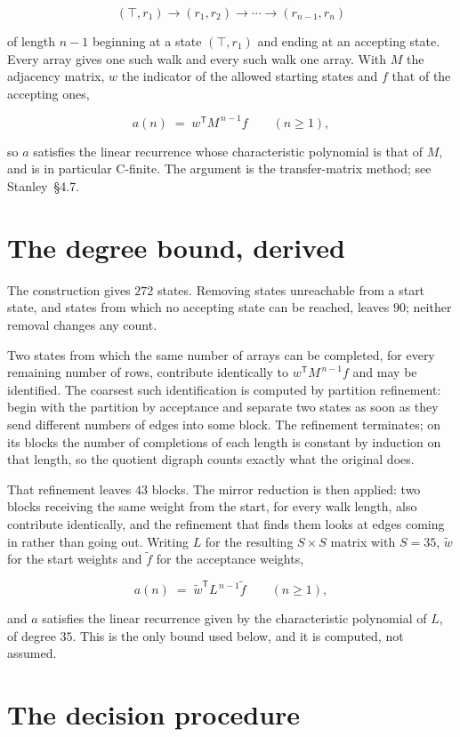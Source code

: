 \documentclass[11pt]{article}
\theoremstyle{definition}
\begin{document}
\[(\top,r_1) \to (r_1,r_2) \to \cdots \to (r_{n-1},r_n)\]

of length $n-1$ beginning at a state $(\top,r_1)$ and ending at an accepting state. Every array gives one such walk and every such walk one array. With $M$ the adjacency matrix, $w$ the indicator of the allowed starting states and $f$ that of the accepting ones,

\[a(n) \;=\; w^{\mathsf T} M^{\,n-1} f \qquad (n \ge 1),\]

so $a$ satisfies the linear recurrence whose characteristic polynomial is that of $M$, and is in particular C-finite. The argument is the transfer-matrix method; see Stanley~\S4.7.

\section{The degree bound, derived}

The construction gives $272$ states. Removing states unreachable from a start state, and states from which no accepting state can be reached, leaves $90$; neither removal changes any count.

Two states from which the same number of arrays can be completed, for every remaining number of rows, contribute identically to $w^{\mathsf T}M^{\,n-1}f$ and may be identified. The coarsest such identification is computed by partition refinement: begin with the partition by acceptance and separate two states as soon as they send different numbers of edges into some block. The refinement terminates; on its blocks the number of completions of each length is constant by induction on that length, so the quotient digraph counts exactly what the original does.

That refinement leaves $43$ blocks. The mirror reduction is then applied: two blocks receiving the same weight from the start, for every walk length, also contribute identically, and the refinement that finds them looks at edges coming in rather than going out. Writing $L$ for the resulting $S \times S$ matrix with $S = 35$, $\tilde w$ for the start weights and $\tilde f$ for the acceptance weights,

\[a(n) \;=\; \tilde w^{\mathsf T} L^{\,n-1} \tilde f \qquad (n \ge 1),\]

and $a$ satisfies the linear recurrence given by the characteristic polynomial of $L$, of degree $35$. This is the only bound used below, and it is computed, not assumed.

\section{The decision procedure}
\end{document}
